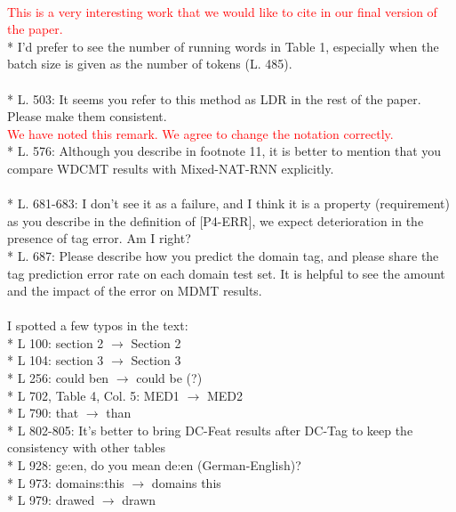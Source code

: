 \documentclass[12pt,times,a4paper,twoside]{article}
\newcommand{\fyTodo}[1]{\Todo[FY:]{\textcolor{orange}{#1}}}
\theoremstyle{definition}
\begin{document}
\\
\textcolor{red}{This is a very interesting work that we would like to cite in our final version of the paper.}
\\
* I’d prefer to see the number of running words in Table 1, especially when the batch size is given as the number of tokens (L. 485).
\\
\fyTodo{to report number of tokens of the datasets}
\\
* L. 503: It seems you refer to this method as LDR in the rest of the paper. Please make them consistent.
\\
\textcolor{red}{We have noted this remark. We agree to change the notation correctly.}
\\
* L. 576: Although you describe in footnote 11, it is better to mention that you compare WDCMT results with Mixed-NAT-RNN explicitly.
\\
\fyTodo{to explicitly compare WDCNMT with Mixed-NAT-RNN}
\\
* L. 681-683: I don’t see it as a failure, and I think it is a property (requirement) as you describe in the definition of [P4-ERR], we expect deterioration in the presence of tag error. Am I right?
\\
* L. 687: Please describe how you predict the domain tag, and please share the tag prediction error rate on each domain test set. It is helpful to see the amount and the impact of the error on MDMT results.
\\
\fyTodo{to report in details the tag prediction.}
\\
I spotted a few typos in the text:
\\
* L 100: section 2 $\rightarrow$ Section 2
\\
* L 104: section 3 $\rightarrow$ Section 3
\\
* L 256: could ben $\rightarrow$ could be (?)
\\
* L 702, Table 4, Col. 5: MED1 $\rightarrow$ MED2
\\
* L 790: that $\rightarrow$ than
\\
* L 802-805: It’s better to bring DC-Feat results after DC-Tag to keep the consistency with other tables 
\\
* L 928: ge:en, do you mean de:en (German-English)? 
\\
* L 973: domains:this $\rightarrow$ domains this
\\
* L 979: drawed $\rightarrow$ drawn 
\end{document}
